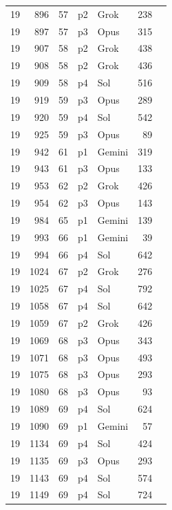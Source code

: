 \begin{longtable}{r r r l l r L{2.2in}}
19 & 896 & 57 & p2 & Grok & 238 &  \\
19 & 897 & 57 & p3 & Opus & 315 &  \\
19 & 907 & 58 & p2 & Grok & 438 &  \\
19 & 908 & 58 & p2 & Grok & 436 &  \\
19 & 909 & 58 & p4 & Sol & 516 &  \\
19 & 919 & 59 & p3 & Opus & 289 &  \\
19 & 920 & 59 & p4 & Sol & 542 &  \\
19 & 925 & 59 & p3 & Opus & 89 &  \\
19 & 942 & 61 & p1 & Gemini & 319 &  \\
19 & 943 & 61 & p3 & Opus & 133 &  \\
19 & 953 & 62 & p2 & Grok & 426 &  \\
19 & 954 & 62 & p3 & Opus & 143 &  \\
19 & 984 & 65 & p1 & Gemini & 139 &  \\
19 & 993 & 66 & p1 & Gemini & 39 &  \\
19 & 994 & 66 & p4 & Sol & 642 &  \\
19 & 1024 & 67 & p2 & Grok & 276 &  \\
19 & 1025 & 67 & p4 & Sol & 792 &  \\
19 & 1058 & 67 & p4 & Sol & 642 &  \\
19 & 1059 & 67 & p2 & Grok & 426 &  \\
19 & 1069 & 68 & p3 & Opus & 343 &  \\
19 & 1071 & 68 & p3 & Opus & 493 &  \\
19 & 1075 & 68 & p3 & Opus & 293 &  \\
19 & 1080 & 68 & p3 & Opus & 93 &  \\
19 & 1089 & 69 & p4 & Sol & 624 &  \\
19 & 1090 & 69 & p1 & Gemini & 57 &  \\
19 & 1134 & 69 & p4 & Sol & 424 &  \\
19 & 1135 & 69 & p3 & Opus & 293 &  \\
19 & 1143 & 69 & p4 & Sol & 574 &  \\
19 & 1149 & 69 & p4 & Sol & 724 &  \\

\end{longtable}
